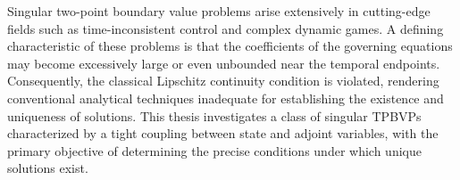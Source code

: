 \documentclass{GZUbachelorthesis}
\begin{document}
\maketitle %


\begin{tocabstract} %
\begin{abstract}[奇异两点边值问题，均衡Riccati方程，存在唯一性，压缩映射原理，物理信息神经网络
	] %
    奇异两点边值问题广泛存在于时间不一致控制与复杂动态博弈等前沿领域中，这类问题的特点是：在时间端点附近，方程的系数可能会变得非常大甚至无界。这就导致传统的Lipschitz连续性条件不再成立，使得我们很难用常规方法去判断解存在唯一性。本文主要研究一类状态变量和伴随变量紧密耦合的奇异两点边值问题，重点讨论它的解在什么条件下存在且唯一。
    
    由于奇异性会导致传统的Picard迭代和打靶法失效，本文引入均衡Riccati方程，将原本耦合的双端约束系统进行解耦。通过代数推导，本文证明了一个充要条件：该奇异两点边值问题存在唯一解，当且仅当对应的均衡Riccati方程存在唯一的对称正定解。
    
    进一步，针对奇异性导致压缩映射条件不成立的问题，本文在函数空间中选取一个固定半径的闭球，利用Banach压缩映射原理证明了局部解的存在性。随后，通过向后归纳法将局部解逐步延拓到整个时间区间，严格证明了均衡Riccati方程存在唯一的对称解。这一结论给出了奇异条件下解的先验估计，弥补了原有理论在这方面的空白。
    
    最后，为了对理论结果进行数值验证，本文针对一维奇异系统搭建了物理信息神经网络（PINNs）。我们将Riccati方程的演化规律直接嵌入网络的损失函数中，有效避免了传统有限差分法（FDM）在奇点附近容易发散的问题。实验结果显示，数值解与解析解高度吻合，直观地验证了本文存在唯一性定理。
\end{abstract}
\begin{enabstract} %
  Singular two-point boundary value problems  arise extensively in cutting-edge fields such as time-inconsistent control and complex dynamic games. A defining characteristic of these problems is that the coefficients of the governing equations may become excessively large or even unbounded near the temporal endpoints. Consequently, the classical Lipschitz continuity condition is violated, rendering conventional analytical techniques inadequate for establishing the existence and uniqueness of solutions. This thesis investigates a class of singular TPBVPs characterized by a tight coupling between state and adjoint variables, with the primary objective of determining the precise conditions under which unique solutions exist.
  

\end{enabstract}
\end{tocabstract}
\end{document}

